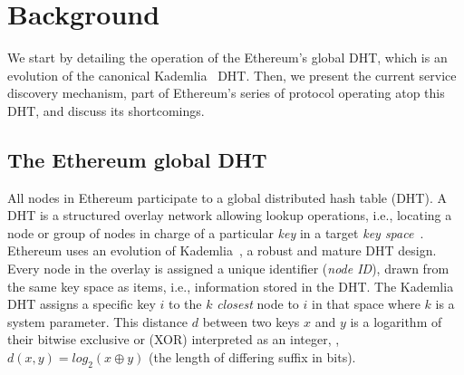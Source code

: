 

\section{Background}
\label{sec:background}

We start by detailing the operation of the Ethereum's global DHT, which is an evolution of the canonical Kademlia~\cite{maymounkov2002kademlia} DHT.
Then, we present the current service discovery mechanism, part of Ethereum's \discv series of protocol operating atop this DHT, and discuss its shortcomings.

\subsection{The Ethereum global DHT}
\label{sec:background:dht}

All nodes in Ethereum participate to a global distributed hash table (DHT).
A DHT is a structured overlay network allowing lookup operations, i.e., locating a node or group of nodes in charge of a particular \emph{key} in a target \emph{key space}~\cite{chord,rowstron2001pastry}. Ethereum uses an evolution of Kademlia~\cite{maymounkov2002kademlia}, a robust and mature DHT design. %
Every node in the overlay is assigned a unique identifier (\emph{node ID}), drawn from the same key space as items, i.e., information stored in the DHT. %
The Kademlia DHT assigns a specific key $i$ to the $k$ \emph{closest} node to $i$ in that space where $k$ is a system parameter.
This distance $d$ between two keys $x$ and $y$ is a logarithm of their bitwise exclusive or (XOR) interpreted as an integer, \ie, $d(x,y) = \textit{log}_2(x \oplus y)$ (\ie the length of differing suffix in bits).

